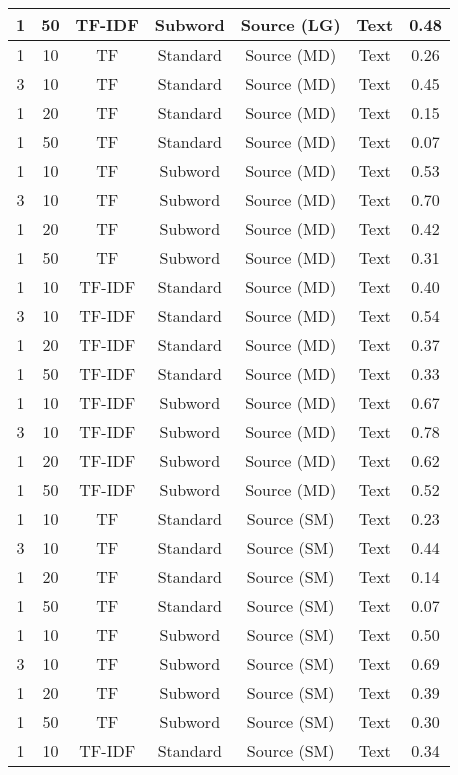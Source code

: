 \begin{longtable}{|c|c|c|c|c|c|c|}
\hline
1 & 50 & TF-IDF & Subword & Source (LG) & Text & 0.48 \\
\hline
1 & 10 & TF & Standard & Source (MD) & Text & 0.26 \\
\hline
3 & 10 & TF & Standard & Source (MD) & Text & 0.45 \\
\hline
1 & 20 & TF & Standard & Source (MD) & Text & 0.15 \\
\hline
1 & 50 & TF & Standard & Source (MD) & Text & 0.07 \\
\hline
1 & 10 & TF & Subword & Source (MD) & Text & 0.53 \\
\hline
3 & 10 & TF & Subword & Source (MD) & Text & 0.70 \\
\hline
1 & 20 & TF & Subword & Source (MD) & Text & 0.42 \\
\hline
1 & 50 & TF & Subword & Source (MD) & Text & 0.31 \\
\hline
1 & 10 & TF-IDF & Standard & Source (MD) & Text & 0.40 \\
\hline
3 & 10 & TF-IDF & Standard & Source (MD) & Text & 0.54 \\
\hline
1 & 20 & TF-IDF & Standard & Source (MD) & Text & 0.37 \\
\hline
1 & 50 & TF-IDF & Standard & Source (MD) & Text & 0.33 \\
\hline
1 & 10 & TF-IDF & Subword & Source (MD) & Text & 0.67 \\
\hline
3 & 10 & TF-IDF & Subword & Source (MD) & Text & 0.78 \\
\hline
1 & 20 & TF-IDF & Subword & Source (MD) & Text & 0.62 \\
\hline
1 & 50 & TF-IDF & Subword & Source (MD) & Text & 0.52 \\
\hline
1 & 10 & TF & Standard & Source (SM) & Text & 0.23 \\
\hline
3 & 10 & TF & Standard & Source (SM) & Text & 0.44 \\
\hline
1 & 20 & TF & Standard & Source (SM) & Text & 0.14 \\
\hline
1 & 50 & TF & Standard & Source (SM) & Text & 0.07 \\
\hline
1 & 10 & TF & Subword & Source (SM) & Text & 0.50 \\
\hline
3 & 10 & TF & Subword & Source (SM) & Text & 0.69 \\
\hline
1 & 20 & TF & Subword & Source (SM) & Text & 0.39 \\
\hline
1 & 50 & TF & Subword & Source (SM) & Text & 0.30 \\
\hline
1 & 10 & TF-IDF & Standard & Source (SM) & Text & 0.34 \\

\end{longtable}
